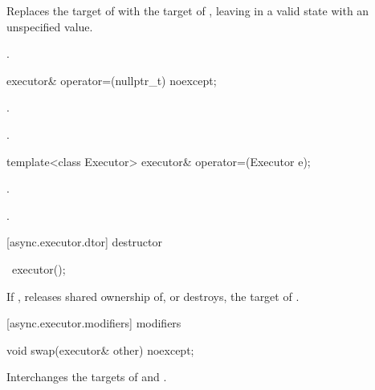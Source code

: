 \begin{itemdescr}
\pnum
\effects Replaces the target of  with the target of , leaving  in a valid state with an unspecified value.

\pnum
\returns {}.
\end{itemdescr}

%
\begin{itemdecl}
executor& operator=(nullptr_t) noexcept;
\end{itemdecl}

\begin{itemdescr}
\pnum
\effects {}.

\pnum
\returns {}.
\end{itemdescr}

%
\begin{itemdecl}
template<class Executor> executor& operator=(Executor e);
\end{itemdecl}

\begin{itemdescr}
\pnum
\effects {}.

\pnum
\returns {}.
\end{itemdescr}



[async.executor.dtor]{ destructor}

%
\begin{itemdecl}
~executor();
\end{itemdecl}

\begin{itemdescr}
\pnum
\effects If , releases shared ownership of, or destroys, the target of .
\end{itemdescr}



[async.executor.modifiers]{ modifiers}

%
\begin{itemdecl}
void swap(executor& other) noexcept;
\end{itemdecl}

\begin{itemdescr}
\pnum
\effects Interchanges the targets of  and .
\end{itemdescr}

